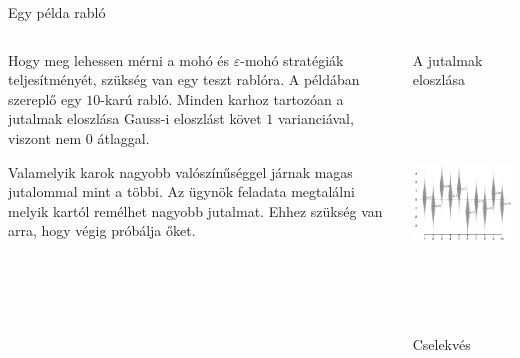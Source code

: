 \documentclass[english, aspectratio=169]{beamer}
\begin{document}
\begin{frame}{Egy példa rabló}
\begin{columns}
\begin{column}{.5\textwidth}
Hogy meg lehessen mérni a mohó és $\varepsilon$-mohó stratégiák teljesítményét, szükség van egy teszt rablóra. A példában szereplő egy $10$-karú rabló. Minden karhoz tartozóan a jutalmak eloszlása Gauss-i eloszlást követ $1$ varianciával, viszont nem $0$ átlaggal. \par\smallskip
Valamelyik karok nagyobb valószínűséggel járnak magas jutalommal mint a többi. Az ügynök feladata megtalálni melyik kartól remélhet nagyobb jutalmat. Ehhez szükség van arra, hogy végig próbálja őket.
\end{column}
\begin{column}{.5\textwidth}
\begin{center}
A jutalmak eloszlása
\includegraphics[width=7cm, height=6cm, keepaspectratio]{images/solving_6.png}
\begin{scriptsize}
Cselekvés
\end{scriptsize}
\end{center}
\end{column}
\end{columns}
\end{frame}
\end{document}
